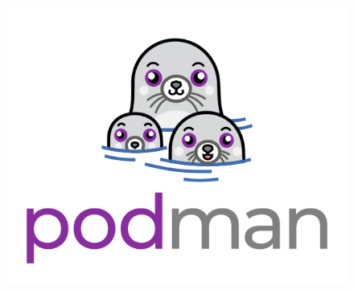 \documentclass[aspectratio=169]{beamer}
\begin{document}
\begin{frame}
\begin{columns}
\begin{column}{0.5\textwidth}
\begin{figure}
                \includegraphics[scale=0.3]{logos/podman-logo.png}
            \end{figure}
        \end{column}
    \end{columns}
\end{frame}
\end{document}
